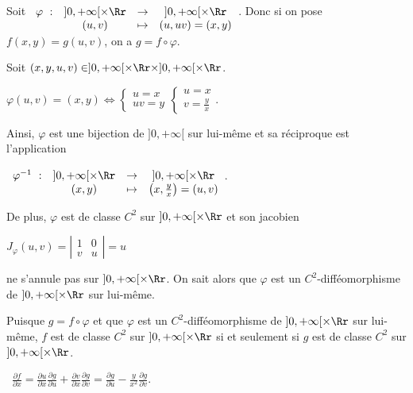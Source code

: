 {\begin{enumerate}
{Soit $\begin{array}[t]{cccc}
\varphi~:&]0,+\infty[\times\Rr&\rightarrow&]0,+\infty[\times\Rr\\
 &(u,v)&\mapsto&(u,uv)=(x,y)
\end{array}
$. Donc si on pose $f(x,y)=g(u,v)$, on a $g=f\circ\varphi$.

Soit $(x,y,u,v)\in]0,+\infty[\times\Rr\times]0,+\infty[\times\Rr$.

\begin{center}
$\varphi(u,v)=(x,y)\Leftrightarrow\left\{
\begin{array}{l}
u=x\\
uv=y
\end{array}
\right.\left\{
\begin{array}{l}
u=x\\
v= \frac{y}{x}
\end{array}
\right.$.
\end{center}

Ainsi, $\varphi$ est une bijection de $]0,+\infty[$ sur lui-même et sa réciproque est l'application 

\begin{center}
$\begin{array}[t]{cccc}
\varphi^{-1}~:&]0,+\infty[\times\Rr&\rightarrow&]0,+\infty[\times\Rr\\
 &(x,y)&\mapsto&\left(x, \frac{y}{x}\right)=(u,v)
\end{array}
$.
\end{center}

De plus, $\varphi$ est de classe $C^2$ sur $]0,+\infty[\times\Rr$ et son jacobien

\begin{center}
$J_\varphi(u,v)=\left|
\begin{array}{cc}
1&0\\
v&u
\end{array}
\right|=u$
\end{center}

ne s'annule pas sur $]0,+\infty[\times\Rr$. On sait alors que $\varphi$ est un $C^2$-difféomorphisme de $]0,+\infty[\times\Rr$ sur lui-même.

Puisque $g=f\circ\varphi$ et que $\varphi$ est un $C^2$-difféomorphisme de $]0,+\infty[\times\Rr$ sur lui-même, $f$ est de classe $C^2$ sur $]0,+\infty[\times\Rr$ si et seulement si $g$ est de classe $C^2$ sur $]0,+\infty[\times\Rr$.

\textbullet~$ \frac{\partial f}{\partial x}= \frac{\partial u}{\partial x} \frac{\partial g}{\partial u}+ \frac{\partial v}{\partial x} \frac{\partial g}{\partial v}= \frac{\partial g}{\partial u}- \frac{y}{x^2} \frac{\partial g}{\partial v}$.

}
\end{enumerate}}
